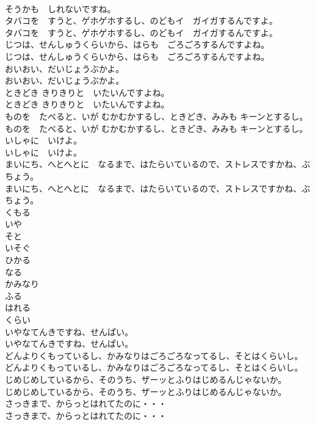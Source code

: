 \documentclass[8pt]{extreport}
\begin{document}
\begin{CJK}{UTF8}{min}
\\	そうかも　しれないですね。
\\	タバコを　すうと、ゲホゲホするし、のどもイ　ガイガするんですよ。
\\	タバコを　すうと、ゲホゲホするし、のどもイ　ガイガするんですよ。
\\	じつは、せんしゅうくらいから、はらも　ごろごろするんですよね。
\\	じつは、せんしゅうくらいから、はらも　ごろごろするんですよね。
\\	おいおい、だいじょうぶかよ。
\\	おいおい、だいじょうぶかよ。
\\	ときどき きりきりと　いたいんですよね。
\\	ときどき きりきりと　いたいんですよね。
\\	ものを　たべると、いが むかむかするし、ときどき、みみも キーンとするし。
\\	ものを　たべると、いが むかむかするし、ときどき、みみも キーンとするし。
\\	いしゃに　いけよ。
\\	いしゃに　いけよ。
\\	まいにち、へとへとに　なるまで、はたらいているので、ストレスですかね、ぶちょう。
\\	まいにち、へとへとに　なるまで、はたらいているので、ストレスですかね、ぶちょう。
\\	くもる
\\	いや
\\	そと
\\	いそぐ
\\	ひかる
\\	なる
\\	かみなり
\\	ふる
\\	はれる
\\	くらい
\\	いやなてんきですね、せんぱい。
\\	いやなてんきですね、せんぱい。
\\	どんよりくもっているし、かみなりはごろごろなってるし、そとはくらいし。
\\	どんよりくもっているし、かみなりはごろごろなってるし、そとはくらいし。
\\	じめじめしているから、そのうち、ザーッとふりはじめるんじゃないか。
\\	じめじめしているから、そのうち、ザーッとふりはじめるんじゃないか。
\\	さっきまで、からっとはれてたのに・・・
\\	さっきまで、からっとはれてたのに・・・

\end{CJK}
\end{document}
